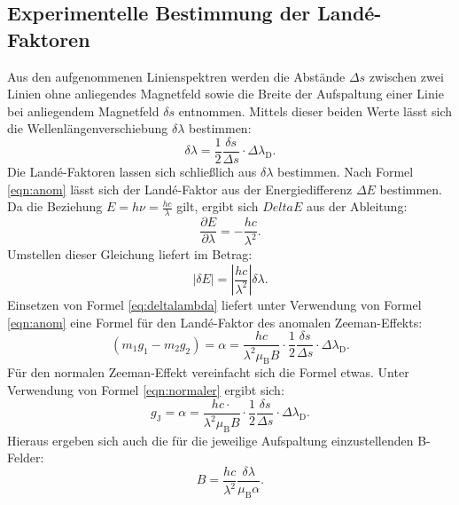 \subsection{Experimentelle Bestimmung der Landé-Faktoren}
Aus den aufgenommenen Linienspektren werden die Abstände $\Delta s$ zwischen zwei Linien ohne anliegendes Magnetfeld sowie die Breite der Aufspaltung einer Linie bei anliegendem Magnetfeld $\delta s$ entnommen.
Mittels dieser beiden Werte lässt sich die Wellenlängenverschiebung $\delta \lambda$ bestimmen:
\begin{equation}
  \label{eq:deltalambda}
  \delta \lambda = \frac{1}{2} \frac{\delta s}{\Delta s}\cdot \Delta \lambda_{\mathrm{D}}\mathrm{.}
\end{equation}
Die Landé-Faktoren lassen sich schließlich aus $\delta \lambda$ bestimmen.
Nach Formel \eqref{eqn:anom} lässt sich der Landé-Faktor aus der Energiedifferenz $\Delta E$ bestimmen. Da die Beziehung $E=h \nu=\frac{hc}{\lambda}$ gilt, ergibt sich $Delta E$ aus der Ableitung:
\begin{equation}
  \frac{\partial E}{\partial \lambda} = -\frac{hc}{\lambda^2}\mathrm{.}
\end{equation}
Umstellen dieser Gleichung liefert im Betrag:
\begin{equation}
 | \delta E | = \left| \frac{hc}{\lambda^2} \right| \delta \lambda\mathrm{.}
\end{equation}
Einsetzen von Formel \eqref{eq:deltalambda} liefert unter Verwendung von Formel \eqref{eqn:anom} eine Formel für den Landé-Faktor des anomalen Zeeman-Effekts:
\begin{equation}
  \label{eqn:g_exp}
   \left(m_1g_1-m_2g_2\right)=\alpha= \frac{hc}{\lambda^2\mu_{\mathrm{B}}B}\cdot \frac{1}{2} \frac{\delta s}{\Delta s}\cdot \Delta \lambda_{\mathrm{D}}\mathrm{.}
\end{equation}
Für den normalen Zeeman-Effekt vereinfacht sich die Formel etwas. Unter Verwendung von Formel \eqref{eqn:normaler} ergibt sich:
\begin{equation}
  \label{eqn:g_expnorm}
   g_{\mathrm{J}}=\alpha= \frac{hc\cdot}{\lambda^2\mu_{\mathrm{B}}B}\cdot \frac{1}{2} \frac{\delta s}{\Delta s}\cdot \Delta \lambda_{\mathrm{D}}\mathrm{.}
\end{equation}
Hieraus ergeben sich auch die für die jeweilige Aufspaltung einzustellenden B-Felder:
\begin{equation}
  \label{eqn:b-feld}
  B=\frac{hc}{\lambda^2} \frac{\delta \lambda}{\mu_{\mathrm{B}}\alpha}\mathrm{.}
\end{equation}
